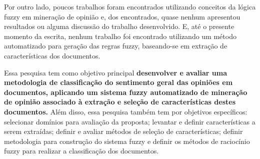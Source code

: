 \documentclass[template.tex]{subfiles}
\begin{document}
Por outro lado, poucos trabalhos foram encontrados utilizando conceitos da lógica fuzzy em mineração de opinião e, dos encontrados, quase nenhum apresentou resultados ou alguma discussão do trabalho desenvolvido. E, até o presente momento da escrita, nenhum trabalho foi encontrado utilizando um método automatizado para geração das regras fuzzy, baseando-se em extração de características dos documentos. 


Essa pesquisa tem como objetivo principal \textbf{desenvolver e avaliar uma metodologia de classificação do sentimento geral das opiniões em documentos, aplicando um sistema fuzzy automatizado de mineração de opinião associado à extração e seleção de características destes documentos.} Além disso, essa pesquisa também tem por objetivos específicos: selecionar domínios para avaliação da proposta; levantar e definir características a serem extraídas; definir e avaliar métodos de seleção de características; definir metodologia para construção do sistema fuzzy e definir os métodos de raciocínio fuzzy para realizar a classificação dos documentos.

\end{document}
